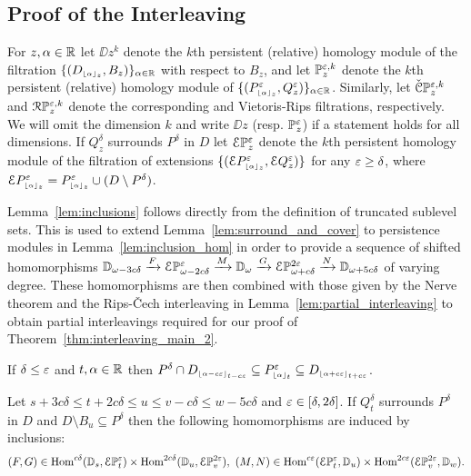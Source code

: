 
\subsection{Proof of the Interleaving}

For $z,\alpha\in\R$ let $\DD{z}^k$ denote the $k$th persistent (relative) homology module of the filtration $\{(D\subi{z}{\alpha},B_z)\}_{\alpha\in\R}$ with respect to $B_z$, and let $\PP{z}{\e,k}$ denote the $k$th persistent (relative) homology module of $\{(P\subi{z}{\alpha}^\e,Q_z^\e)\}_{\alpha\in\R}$.
Similarly, let $\CPP{z}{\e,k}$ and $\RPP{z}{\e,k}$ denote the corresponding \Cech and Vietoris-Rips filtrations, respectively.
We will omit the dimension $k$ and write $\DD{z}$ (resp. $\PP{z}{\e}$) if a statement holds for all dimensions.
If $Q_z^\delta$ surrounds $P^\delta$ in $D$ let $\ext{\PP{z}{\e}}$ denote the $k$th persistent homology module of the filtration of extensions $\{(\ext{P\subi{z}{\alpha}^\e},\ext{Q_z^\e})\}$ for any $\e\geq\delta$, where $\ext{P\subi{z}{\alpha}^\e} = P\subi{z}{\alpha}^\e \cup (D\setminus P^\delta)$.

Lemma~\ref{lem:inclusions} follows directly from the definition of truncated sublevel sets.
This is used to extend Lemma~\ref{lem:surround_and_cover} to persistence modules in Lemma~\ref{lem:inclusion_hom} in order to provide a sequence of shifted homomorphisms $\DD{\omega-3c\delta}\xrightarrow{F}\E\PP{\omega-2c\delta}{\e}\xrightarrow{M}\DD{\omega}\xrightarrow{G}\E\PP{\omega+c\delta}{2\e}\xrightarrow{N}\DD{\omega+5c\delta}$ of varying degree.
These homomorphisms are then combined with those given by the Nerve theorem and the Rips-\v Cech interleaving in Lemma~\ref{lem:partial_interleaving} to obtain partial interleavings required for our proof of Theorem~\ref{thm:interleaving_main_2}.

\begin{lemma}\label{lem:inclusions}
  If $\delta\leq\e$ and $t,\alpha\in\R$ then $P^\delta\cap D\subi{t-c\e}{\alpha-c\e}\subseteq P\subi{t}{\alpha}^\e\subseteq D\subi{t+c\e}{\alpha+c\e}$.
\end{lemma}

\begin{lemma}\label{lem:inclusion_hom}
  Let $s + 3c\delta\leq t + 2c\delta\leq u\leq v-c\delta\leq w-5c\delta$ and $\e\in [\delta,2\delta]$.
  If $Q_{t}^\delta$ surrounds $P^\delta$ in $D$ and $D\setminus B_u\subseteq P^\delta$ then the following homomorphisms are induced by inclusions:
  \[(F, G)\in \Hom^{c\delta}(\DD{s}, \E\PP{t}{\e})\times \Hom^{2c\delta}(\DD{u}, \E\PP{v}{2\e}),\ (M, N)\in \Hom^{c\e}(\E\PP{t}{\e},\DD{u})\times\Hom^{2c\e}(\E\PP{v}{2\e}, \DD{w}).\]
\end{lemma}

